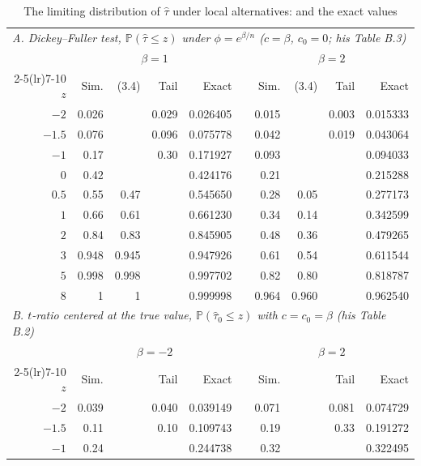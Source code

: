 \documentclass[ecta,nameyear,final]{econsocart}
\newcommand{\PP}{{\mathbb P}}
\theoremstyle{plain}
\theoremstyle{definition}
\begin{document}
\begin{table}[tbp]
\caption{The limiting distribution of $\hat\tau$ under local alternatives: \cite{Larsson1995} and the exact values}
\label{tab:larsson}
\begin{center}
\footnotesize
\setlength{\tabcolsep}{4pt}
\begin{tabular}{rrrrrcrrrr}
\toprule
\multicolumn{10}{l}{\emph{A. Dickey--Fuller test, $\PP(\hat\tau\le z)$ under $\phi=e^{\beta/n}$ ($c=\beta$, $c_0=0$; his Table B.3)}}\\[0.3ex]
 & \multicolumn{4}{c}{$\beta=1$} & & \multicolumn{4}{c}{$\beta=2$}\\
\cmidrule(lr){2-5}\cmidrule(lr){7-10}
$z$ & Sim. & (3.4) & Tail & Exact & & Sim. & (3.4) & Tail & Exact\\
\midrule
$-2$   & 0.026 & & 0.029 & 0.026405 & & 0.015 & & 0.003 & 0.015333\\
$-1.5$ & 0.076 & & 0.096 & 0.075778 & & 0.042 & & 0.019 & 0.043064\\
$-1$   & 0.17  & & 0.30  & 0.171927 & & 0.093 & &       & 0.094033\\
$0$    & 0.42  & &       & 0.424176 & & 0.21  & &       & 0.215288\\
$0.5$  & 0.55  & 0.47 & & 0.545650 & & 0.28  & 0.05 & & 0.277173\\
$1$    & 0.66  & 0.61 & & 0.661230 & & 0.34  & 0.14 & & 0.342599\\
$2$    & 0.84  & 0.83 & & 0.845905 & & 0.48  & 0.36 & & 0.479265\\
$3$    & 0.948 & 0.945 & & 0.947926 & & 0.61 & 0.54 & & 0.611544\\
$5$    & 0.998 & 0.998 & & 0.997702 & & 0.82 & 0.80 & & 0.818787\\
$8$    & 1     & 1     & & 0.999998 & & 0.964 & 0.960 & & 0.962540\\
\midrule
\multicolumn{10}{l}{\emph{B. $t$-ratio centered at the true value, $\PP(\hat\tau_0\le z)$ with $c=c_0=\beta$ (his Table B.2)}}\\[0.3ex]
 & \multicolumn{4}{c}{$\beta=-2$} & & \multicolumn{4}{c}{$\beta=2$}\\
\cmidrule(lr){2-5}\cmidrule(lr){7-10}
$z$ & Sim. & & Tail & Exact & & Sim. & & Tail & Exact\\
\midrule
$-2$   & 0.039 & & 0.040 & 0.039149 & & 0.071 & & 0.081 & 0.074729\\
$-1.5$ & 0.11  & & 0.10  & 0.109743 & & 0.19  & & 0.33  & 0.191272\\
$-1$   & 0.24  & &       & 0.244738 & & 0.32  & &       & 0.322495\\

\end{tabular}
\end{center}
\end{table}
\end{document}
